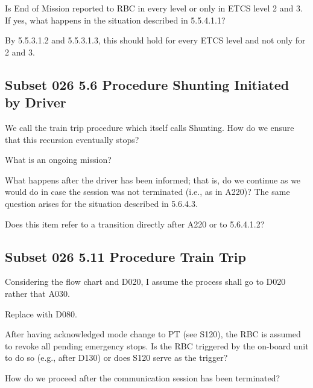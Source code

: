 \documentclass{template/openetcs_article}
\begin{document}
Is End of Mission reported to RBC in every level or only in ETCS level 2 and 3. If yes, what happens in the situation described in 5.5.4.1.1?

By 5.5.3.1.2 and 5.5.3.1.3, this should hold for every ETCS level and not only for 2 and 3. 



\subsection{Subset 026 5.6 Procedure Shunting Initiated by Driver}

We call the train trip procedure which itself calls Shunting. How do we ensure that this recursion eventually stops?

What is an ongoing mission?

What happens after the driver has been informed; that is, do we continue as we would do in case the session was not terminated (i.e., as in A220)? The same question arises for the situation described in 5.6.4.3.

Does this item refer to a transition directly after A220 or to 5.6.4.1.2?





\subsection{Subset 026 5.11 Procedure Train Trip}

Considering the flow chart and D020, I assume the process shall go to D020 rather that A030.

Replace with D080.

After having acknowledged mode change to PT (see S120), the RBC is assumed to revoke all pending emergency stops. Is the RBC triggered by the on-board unit to do so (e.g., after D130) or does S120 serve as the trigger?

How do we proceed after the communication session has been terminated?
\end{document}
